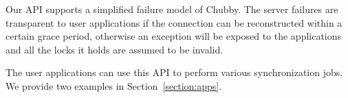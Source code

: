 Our API supports a simplified failure model of Chubby. The server failures
are transparent to user applications if the connection can be reconstructed
within a certain grace period, otherwise an exception will be exposed to
the applications and all the locks it holds are assumed to be invalid.

The user applications can use this API to perform various synchronization
jobs. We provide two examples in Section~\ref{section:apps}.


